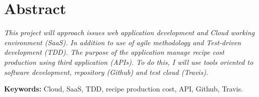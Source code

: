 \documentclass[a4paper,openright,14pt]{book}
\begin{document}
\chapter*{Abstract}

\emph{This project will approach issues web application development and Cloud working environment (SaaS). In addition to use of agile methodology and Test-driven development (TDD). The purpose of the application manage recipe cost production using third application (APIs). To do this, I will use tools oriented to software development, repository (Github) and test cloud (Travis).}

\vspace*{0.2in}
\textbf{Keywords:} Cloud, SaaS, TDD, recipe production cost, API, Github, Travis.
\end{document}

